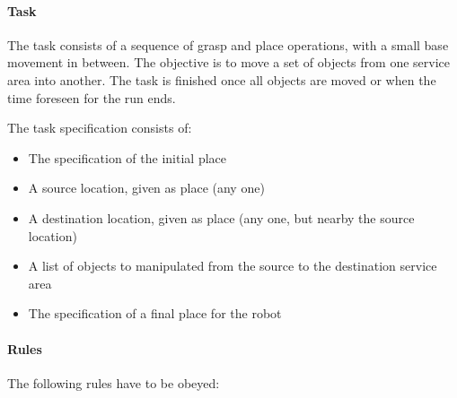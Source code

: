 \paragraph{Task}
 The task consists of a sequence of grasp and place operations, with a small base movement in between. The objective is to move a set of objects from one service area into another.  The task is finished once all objects are moved or when the time foreseen for the run ends.
\par
The task specification consists of:
\begin{itemize}
	\item The specification of the initial place 
	\item A source location, given as place (any one)
	\item A destination location, given as place (any one, but nearby the source location)
	\item A list of objects to manipulated from the source to the destination service area
	\item The specification of a final place for the robot 
\end{itemize}


 \paragraph{Rules}
 The following rules have to be obeyed:


